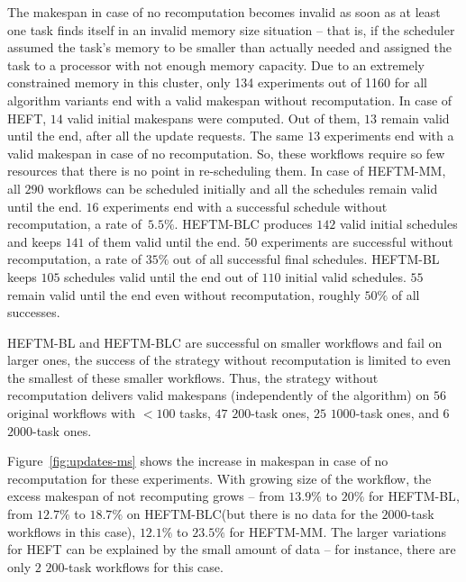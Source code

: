 \documentclass[conference]{IEEEtran}
\newcommand{\algo}[1]{\textsc{#1}}
\newcommand{\heft}{\algo{HEFT}\xspace}
\newcommand{\heftmm}{\algo{HEFTM-MM}\xspace}
\newcommand{\heftbl}{\algo{HEFTM-BL}\xspace}
\newcommand{\heftblc}{\algo{HEFTM-BLC}\xspace}
\newcommand{\AB}[1]{{\color{purple}[AB: #1]}}
\begin{document}
%
The makespan in case of no recomputation becomes invalid as soon as at least one task finds itself in an invalid memory size
situation -- that is, if the scheduler assumed the task's memory to be smaller than actually needed and
assigned the task to a processor with not enough memory capacity.
Due to an extremely constrained memory in this cluster, only 134 experiments out of 1160 
for all algorithm variants end with a valid makespan without recomputation.
In case of \heft, $14$ valid initial makespans were computed.
Out of them, $13$ remain valid until the end, after all the update requests.
The same $13$ experiments end with a valid makespan in case of no recomputation.
So, these workflows require so few resources that there is no point in re-scheduling them.
In case of \heftmm, all $290$ workflows can be scheduled initially and all the schedules remain valid until the end.
$16$ experiments end with a successful schedule without recomputation, a rate of~$5.5\%$.
\heftblc produces $142$ valid initial schedules and keeps $141$ of them valid until the end.
$50$ experiments are successful without recomputation, a rate of $35\%$ out of all successful final schedules.
\heftbl keeps $105$ schedules valid until the end out of $110$ initial valid schedules.
$55$ remain valid until the end even without recomputation, roughly $50\%$ of all successes.

\heftbl and \heftblc are successful on smaller workflows and fail on larger ones, 
the success of the strategy without recomputation is limited to even the smallest of these smaller workflows.
Thus, the strategy without recomputation delivers valid makespans (independently of the algorithm) 
on $56$ original workflows with $<100$ tasks, $47$ $200$-task ones, $25$ $1000$-task ones, and $6$ $2000$-task ones.

Figure~\ref{fig:updates-ms} shows the increase in makespan in case of no recomputation for these experiments.
With growing size of the workflow, the excess makespan of not recomputing grows -- from $13.9\%$ to $20\%$ for \heftbl,
from $12.7\%$ to $18.7\%$ on \heftblc (but there is no data for the $2000$-task workflows in this case), %
$12.1\%$ to $23.5\%$ for \heftmm.
The larger variations for \heft can be explained by the small amount of data -- for instance, there are
only $2$ $200$-task workflows for this case.
\end{document}
